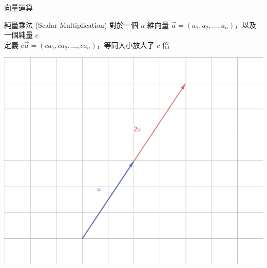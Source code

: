 \documentclass[aspectratio=169]{beamer}
\begin{document}
\begin{frame}{向量運算}
    \begin{alertblock}{純量乘法 (Scalar Multiplication)}
        對於一個 $n$ 維向量 $\vec a = (a_1,a_2,\dots,a_n)$，以及一個純量 $c$ \\
        \vspace{2.5mm}
        定義 $c \vec a = (ca_1,ca_2,\dots,ca_n)$，等同大小放大了 $c$ 倍
    \end{alertblock}
    \begin{center}
        \includegraphics[scale=0.3]{images/scalar_multiplication.png}
    \end{center}
\end{frame}
\end{document}
